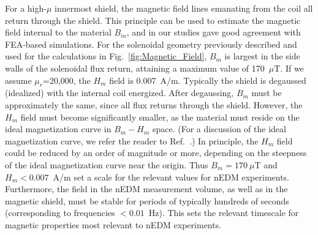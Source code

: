 For a high-$\mu$ innermost shield, the magnetic field lines emanating
from the coil all return through the shield.  This principle can be
used to estimate the magnetic field internal to the material $B_m$,
and in our studies gave good agreement with FEA-based simulations.
For the solenoidal geometry previously described and used for the
calculations in Fig.~\ref{fig:Magnetic_Field}, $B_m$ is largest in the
side walls of the solenoidal flux return, attaining a maximum value of
170~$\mu$T.  If we assume $\mu_r$=20,000, the $H_m$ field is
0.007~A/m.  Typically the shield is degaussed (idealized) with the
internal coil energized.  After degaussing, $B_m$ must be
approximately the same, since all flux returns through the shield.
However, the $H_m$ field must become significantly smaller, as the
material must reside on the ideal magnetization curve in $B_m-H_m$
space.  (For a discussion of the ideal magnetization curve, we refer
the reader to Ref.~\cite{bib:bozorth}.)  In principle, the $H_m$ field
could be reduced by an order of magnitude or more, depending on the
steepness of the ideal magnetization curve near the origin.  Thus
$B_m=170~\mu$T and $H_m<0.007$~A/m set a scale for the relevant values
for nEDM experiments.  Furthermore, the field in the nEDM measurement
volume, as well as in the magnetic shield, must be stable for periods
of typically hundreds of seconds (corresponding to frequencies
$<0.01$~Hz).  This sets the relevant timescale for magnetic properties
most relevant to nEDM experiments.
